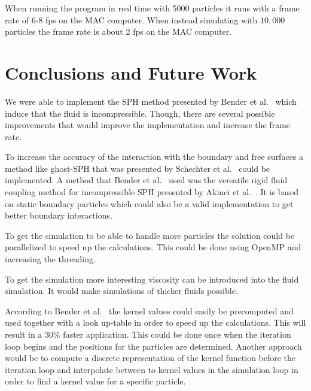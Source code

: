 	When running the program in real time with 5000 particles it runs with a frame rate of 6-8 fps on the MAC computer.
	When instead simulating with $10,000$ particles the frame rate is about 2 fps on the MAC computer.

\section{Conclusions and Future Work}

    We were able to implement the SPH method presented by Bender et al.~\cite{bender} which induce that the fluid is incompressible. Though, there are several possible improvements that would improve the implementation and increase the frame rate.  

    To increase the accuracy of the interaction with the boundary and free surfaces a method like ghost-SPH that was presented by Schechter et al.~\cite{ghost} could be implemented.
    A method that Bender et al.~\cite{bender} used was the versatile rigid fluid coupling method for incompressible SPH presented by Akinci et al.~\cite{akinci2012versatile}.
    It is based on static boundary particles which could also be a valid implementation to get better boundary interactions.

    To get the simulation to be able to handle more particles the solution could be parallelized to speed up the calculations.
    This could be done using OpenMP and increasing the threading.

    To get the simulation more interesting viscosity can be introduced into the fluid simulation.
    It would make simulations of thicker fluids possible.

    According to Bender et al.~\cite{bender} the kernel values could easily be precomputed and used together with a look up-table in order to speed up the calculations. This will result in a $30\%$ faster application.  This could be done once when the iteration loop begins and the positions for the particles are determined. Another approach would be to compute a discrete representation of the kernel function before the iteration loop and interpolate between to kernel values in the simulation loop in order to find a kernel value for a specific particle. 





